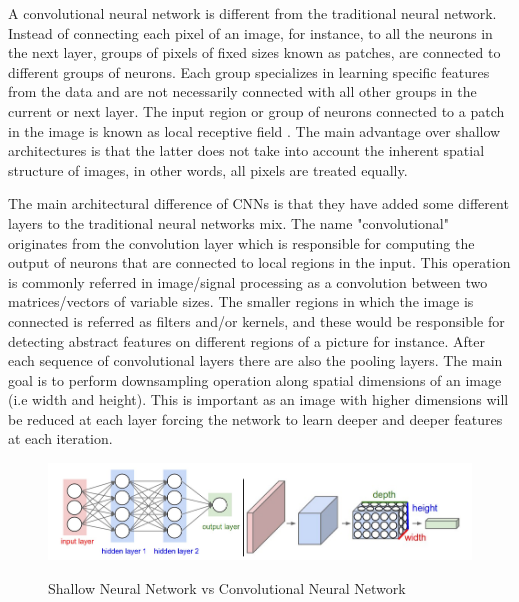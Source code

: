 A convolutional neural network is different from the traditional neural network. Instead of connecting each pixel of an image, for instance, to all the neurons in the next layer, groups of pixels of fixed sizes known as patches, are connected to different groups of neurons. Each group specializes in learning specific features from the data and are not necessarily connected with all other groups in the current or next layer. The input region or group of neurons connected to a patch in the image is known as local receptive field \cite{nielsen2016}. The main advantage over shallow architectures is that the latter does not take into account the inherent spatial structure of images, in other words, all pixels are treated equally.

The main architectural difference of CNNs is that they have added some different layers to the traditional neural networks mix. The name "convolutional" originates from the convolution layer which is responsible for computing the output of neurons that are connected to local regions in the input. This operation is commonly referred in image/signal processing as a convolution between two matrices/vectors of variable sizes. The smaller regions in which the image is connected is referred as filters and/or kernels, and these would be responsible for detecting abstract features on different regions of a picture for instance. After each sequence of convolutional layers there are also the pooling layers. The main goal is to perform downsampling operation along spatial dimensions of an image (i.e width and height). This is important as an image with higher dimensions will be reduced at each layer forcing the network to learn deeper and deeper features at each iteration.

\begin{figure}[!h]
	\centering
	\includegraphics[scale=0.6]{conv.png}
	\caption{Shallow Neural Network vs Convolutional Neural Network}
	\cite{stanford2016}
	\label{fig:conv}
\end{figure}

